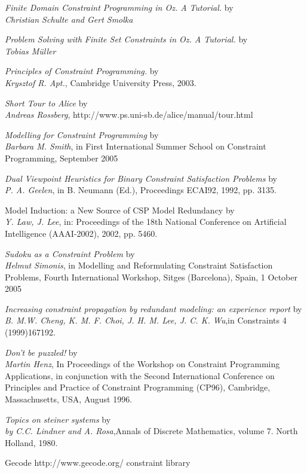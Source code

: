 \documentclass[a4paper,halfparskip]{scrartcl}
\begin{document}
\begin{thebibliography}{99}
 \emph{Finite Domain Constraint Programming in Oz. A Tutorial.} by \\ 
\emph{Christian Schulte and Gert Smolka}

 \emph{Problem Solving with Finite Set Constraints in Oz. A Tutorial.} by \\ 
\emph{Tobias M\"uller}

 \emph{Principles of Constraint Programming.} by \\
 \emph{Krysztof R. Apt.}, Cambridge University Press, 2003.

 \emph{Short Tour to Alice} by\\
\emph{Andreas Rossberg}, http://www.ps.uni-sb.de/alice/manual/tour.html

 \emph{Modelling for Constraint Programming} by\\
\emph{Barbara M. Smith}, in First International Summer School
on Constraint Programming, September 2005

 \emph{Dual Viewpoint Heuristics for Binary
Constraint Satisfaction Problems} by \\ 
\emph{P. A. Geelen}, in B. Neumann
(Ed.), Proceedings ECAI92, 1992, pp. 3135. 

  {Model Induction: a New Source
of CSP Model Redundancy} by \\
\emph{Y. Law, J. Lee}, in: Proceedings of the
18th National Conference on Artificial Intelligence
(AAAI-2002), 2002, pp. 5460.

\emph{Sudoku as a Constraint Problem} by\\
\emph{Helmut Simonis}, in Modelling and Reformulating
Constraint Satisfaction Problems, Fourth International Workshop,
Sitges (Barcelona), Spain, 1 October 2005

\emph{Increasing constraint propagation by redundant
modeling: an experience report} by\\
\emph{B. M.W. Cheng, K. M. F. Choi, J. H. M. Lee, J. C. K. Wu},in 
Constraints 4 (1999)167192.

\emph{Don't be puzzled!} by\\
\emph{ Martin Henz}, In Proceedings of the Workshop on Constraint 
Programming 
Applications, in conjunction with the Second International 
Conference on Principles 
and Practice of Constraint Programming (CP96), Cambridge, 
Massachusetts, USA, August 1996.

 \emph{Topics on steiner systems} by \\ 
\emph{by C.C. Lindner and A. Rosa},Annals of Discrete Mathematics, 
volume 7. North Holland, 1980.

\htmladdnormallink
{Gecode}
{http://www.gecode.org/} constraint library

\end{thebibliography}
\end{document}
